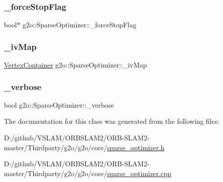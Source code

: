 \mbox{\label{classg2o_1_1_sparse_optimizer_aac4a9f9b7d875ee40cae55f98d3437ab}} 
\subsubsection{\texorpdfstring{\+\_\+force\+Stop\+Flag}{\_forceStopFlag}}
{\footnotesize\ttfamily bool$\ast$ g2o\+::\+Sparse\+Optimizer\+::\+\_\+force\+Stop\+Flag\hspace{0.3cm}{\ttfamily [protected]}}

\mbox{\label{classg2o_1_1_sparse_optimizer_a488b95a90a61454c787e9c13458e510b}} 
\subsubsection{\texorpdfstring{\+\_\+iv\+Map}{\_ivMap}}
{\footnotesize\ttfamily \mbox{\hyperlink{structg2o_1_1_optimizable_graph_a54f01b9b6071e65e6abeebe4afb29dec}{Vertex\+Container}} g2o\+::\+Sparse\+Optimizer\+::\+\_\+iv\+Map\hspace{0.3cm}{\ttfamily [protected]}}

\mbox{\label{classg2o_1_1_sparse_optimizer_a41b3803182a4db6c0ff8c8d4352dd149}} 
\subsubsection{\texorpdfstring{\+\_\+verbose}{\_verbose}}
{\footnotesize\ttfamily bool g2o\+::\+Sparse\+Optimizer\+::\+\_\+verbose\hspace{0.3cm}{\ttfamily [protected]}}



The documentation for this class was generated from the following files\+:\begin{DoxyCompactItemize}
\item 
D\+:/github/\+V\+S\+L\+A\+M/\+O\+R\+B\+S\+L\+A\+M2/\+O\+R\+B-\/\+S\+L\+A\+M2-\/master/\+Thirdparty/g2o/g2o/core/\mbox{\hyperlink{sparse__optimizer_8h}{sparse\+\_\+optimizer.\+h}}\item 
D\+:/github/\+V\+S\+L\+A\+M/\+O\+R\+B\+S\+L\+A\+M2/\+O\+R\+B-\/\+S\+L\+A\+M2-\/master/\+Thirdparty/g2o/g2o/core/\mbox{\hyperlink{sparse__optimizer_8cpp}{sparse\+\_\+optimizer.\+cpp}}\end{DoxyCompactItemize}
